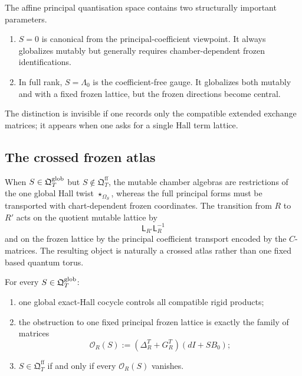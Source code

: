 \begin{remark}
The affine principal quantisation space contains two structurally important
parameters.
\begin{enumerate}[label=(\roman*),leftmargin=2.3em]
\item $S=0$ is canonical from the principal-coefficient viewpoint.  It always
      globalizes mutably but generally requires chamber-dependent frozen
      identifications.
\item In full rank, $S=\Lambda_0$ is the coefficient-free gauge.  It
      globalizes both mutably and with a fixed frozen lattice, but the frozen
      directions become central.
\end{enumerate}
The distinction is invisible if one records only the compatible extended
exchange matrices; it appears when one asks for a single Hall term lattice.
\end{remark}

\subsection{The crossed frozen atlas}

When $S\in\mathfrak Q^{\mathrm{glob}}_T$ but $S\notin\mathfrak Q_T^{\mathrm{ff}}$, the mutable
chamber algebras are restrictions of the one global Hall twist
$\star_{\Omega_S}$, whereas the full principal forms must be transported with
chart-dependent frozen coordinates.  The transition from $R$ to $R'$ acts on
the quotient mutable lattice by
\[
 \mathsf L_{R'}\mathsf L_R^{-1}
\]
and on the frozen lattice by the principal coefficient transport encoded by
the $C$-matrices.  The resulting object is naturally a crossed atlas rather
than one fixed based quantum torus.

\begin{proposition}
\label{prop:mutable-frozen-separation}
For every $S\in\mathfrak Q^{\mathrm{glob}}_T$:
\begin{enumerate}[label=(\roman*),leftmargin=2.3em]
\item one global exact-Hall cocycle controls all compatible rigid products;
\item the obstruction to one fixed principal frozen lattice is exactly the
      family of matrices
      \begin{equation}
       \mathcal O_R(S)
       :=(\Delta_R^T+G_R^T)(dI+SB_0);
       \label{eq:frozen-obstruction-matrix}
      \end{equation}
\item $S\in\mathfrak Q_T^{\mathrm{ff}}$ if and only if every
      $\mathcal O_R(S)$ vanishes.
\end{enumerate}
\end{proposition}

